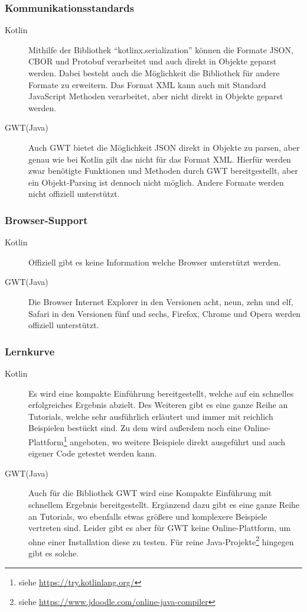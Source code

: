 \subsubsection{Kommunikationsstandards}
\begin{description}
	\item[Kotlin] Mithilfe der Bibliothek \enquote{kotlinx.serialization} können die Formate \gls{JSON}, \gls{CBOR} und \gls{Protobuf} verarbeitet und auch direkt in Objekte geparst werden.
	Dabei besteht auch die Möglichkeit die Bibliothek für andere Formate zu erweitern. Das Format \gls{XML} kann auch mit Standard JavaScript Methoden verarbeitet, aber nicht direkt in Objekte geparst werden. \cite{kotlinxSerialization}
	\item[GWT(Java)] Auch \gls{GWT} bietet die Möglichkeit \gls{JSON} direkt in Objekte zu parsen, aber genau wie bei Kotlin gilt das nicht für das Format \gls{XML}. Hierfür werden zwar benötigte Funktionen und Methoden durch \gls{GWT} bereitgestellt, aber ein Objekt-Parsing ist dennoch nicht möglich. Andere Formate werden nicht offiziell unterstützt. \cite{gwtJSON, gwtXML}
\end{description}

\subsubsection{Browser-Support}
\begin{description}
	\item[Kotlin] Offiziell gibt es keine Information welche Browser unterstützt werden.
	\item[GWT(Java)] Die Browser Internet Explorer in den Versionen acht, neun, zehn und elf, Safari in den Versionen fünf und sechs, Firefox, Chrome und Opera werden offiziell unterstützt. \cite{gwtGettingStarted}
\end{description}

\subsubsection{Lernkurve}
\begin{description}
	\item[Kotlin] Es wird eine kompakte Einführung bereitgestellt, welche auf ein schnelles erfolgreiches Ergebnis abzielt. Des Weiteren gibt es eine ganze Reihe an Tutorials, welche sehr ausführlich erläutert und immer mit reichlich Beispielen bestückt sind. Zu dem wird außerdem noch eine Online-Plattform\footnote{siehe \url{https://try.kotlinlang.org/}} angeboten, wo weitere Beispiele direkt ausgeführt und auch eigener Code getestet werden kann. \cite{kotlinReference}
	\item[GWT(Java)] Auch für die Bibliothek \gls{GWT} wird eine Kompakte Einführung mit schnellem Ergebnis bereitgestellt. Ergänzend dazu gibt es eine ganze Reihe an Tutorials, wo ebenfalls etwas größere und komplexere Beispiele vertreten sind. Leider gibt es aber für \gls{GWT} keine Online-Plattform, um ohne einer Installation diese zu testen. Für reine Java-Projekte\footnote{siehe \url{https://www.jdoodle.com/online-java-compiler}} hingegen gibt es solche.
\end{description}



